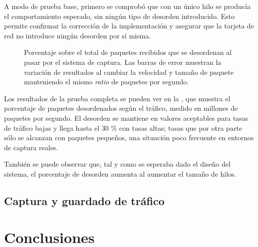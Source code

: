 \documentclass[oneside, draft]{epstfg}
\begin{document}
A modo de prueba base, primero se comprobó que con un único hilo se producía el comportamiento esperado, sin ningún tipo de desorden introducido. Esto permite confirmar la corrección de la implementación y asegurar que la tarjeta de red no introduce ningún desorden por sí misma.

\begin{figure}[hbtp]
\caption[Desorden de paquetes inducido por el sistema de captura]{Porcentaje sobre el total de paquetes recibidos que se desordenan al pasar por el sistema de captura. Las barras de error muestran la variación de resultados al cambiar la velocidad y tamaño de paquete manteniendo el mismo \textit{ratio} de paquetes por segundo.}
\label{fig:Validacion:Ordering}
\end{figure}

Los resultados de la prueba completa se pueden ver en la , que muestra el porcentaje de paquetes desordenados según el tráfico, medido en millones de paquetes por segundo. El desorden se mantiene en valores aceptables para tasas de tráfico bajas y llega hasta el 30 \% con tasas altas; tasas que por otra parte sólo se alcanzan con paquetes pequeños, una situación poco frecuente en entornos de captura reales.

También se puede observar que, tal y como se esperaba dado el diseño del sistema, el porcentaje de desorden aumenta al aumentar el tamaño de hilos.

\section{Captura y guardado de tráfico}

\chapter{Conclusiones}

\backmatter
\appendix

\printnoidxglossaries
\cleardoublepage

\nocite{*}
{}

\cleardoublepage
\printindex
\end{document}
